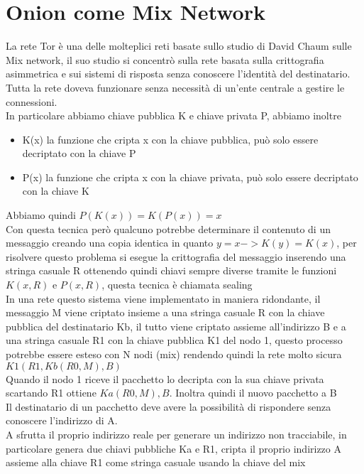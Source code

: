 \section{Onion come Mix Network}
La rete Tor è una delle molteplici reti basate sullo studio di David Chaum sulle Mix network, il suo studio si concentrò sulla rete basata sulla crittografia asimmetrica e sui sistemi di risposta senza conoscere l'identità del destinatario. Tutta la rete doveva funzionare senza necessità di un'ente centrale a gestire le connessioni. \\
In particolare abbiamo chiave pubblica K e chiave privata P, abbiamo inoltre
\begin{itemize}
    \item K(x) la funzione che cripta x con la chiave pubblica, può solo essere decriptato con la chiave P
    \item P(x) la funzione che cripta x con la chiave privata, può solo essere decriptato con la chiave K
\end{itemize}
Abbiamo quindi $P(K(x)) = K(P(x)) = x$ \\
Con questa tecnica però qualcuno potrebbe determinare il contenuto di un messaggio creando una copia identica in quanto $y = x -> K(y) = K(x)$, per risolvere questo problema si esegue la crittografia del messaggio inserendo una stringa casuale R ottenendo quindi chiavi sempre diverse tramite le funzioni $K(x,R)$ e $P(x,R)$, questa tecnica è chiamata sealing \\
In una rete questo sistema viene implementato in maniera ridondante, il messaggio M viene criptato insieme a una stringa casuale R con la chiave pubblica del destinatario Kb, il tutto viene criptato assieme all'indirizzo B e a una stringa casuale R1 con la chiave pubblica K1 del nodo 1, questo processo potrebbe essere esteso con N nodi (mix) rendendo quindi la rete molto sicura \ 
$K1(R1, Kb(R0, M), B)$ \\
Quando il nodo 1 riceve il pacchetto lo decripta con la sua chiave privata scartando R1 ottiene $Ka(R0, M), B$. Inoltra quindi il nuovo pacchetto a B \\
Il destinatario di un pacchetto deve avere la possibilità di rispondere senza conoscere l'indirizzo di A. \\
A sfrutta il proprio indirizzo reale per generare un indirizzo non tracciabile, in particolare genera due chiavi pubbliche Ka e R1, cripta il proprio indirizzo A assieme alla chiave R1 come stringa casuale usando la chiave del mix \\
